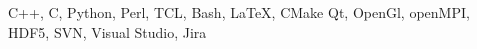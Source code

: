 \begin{cvskills}
     {C++, C, Python, Perl, TCL, Bash, LaTeX, CMake}
     {Qt, OpenGl, openMPI, HDF5, SVN, Visual Studio, Jira}
\end{cvskills}
